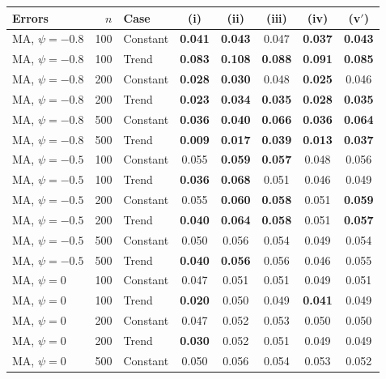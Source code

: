 \begin{tabular}{lrlccccc}
\toprule
Errors & $n$ & Case & (i) & (ii) & (iii) & (iv) & (v$'$) \\
\midrule
MA, $\psi = -0.8$ & 100 & Constant & \textbf{0.041} & \textbf{0.043} & 0.047 & \textbf{0.037} & \textbf{0.043} \\
MA, $\psi = -0.8$ & 100 & Trend & \textbf{0.083} & \textbf{0.108} & \textbf{0.088} & \textbf{0.091} & \textbf{0.085} \\
MA, $\psi = -0.8$ & 200 & Constant & \textbf{0.028} & \textbf{0.030} & 0.048 & \textbf{0.025} & 0.046 \\
MA, $\psi = -0.8$ & 200 & Trend & \textbf{0.023} & \textbf{0.034} & \textbf{0.035} & \textbf{0.028} & \textbf{0.035} \\
MA, $\psi = -0.8$ & 500 & Constant & \textbf{0.036} & \textbf{0.040} & \textbf{0.066} & \textbf{0.036} & \textbf{0.064} \\
MA, $\psi = -0.8$ & 500 & Trend & \textbf{0.009} & \textbf{0.017} & \textbf{0.039} & \textbf{0.013} & \textbf{0.037} \\
\addlinespace
MA, $\psi = -0.5$ & 100 & Constant & 0.055 & \textbf{0.059} & \textbf{0.057} & 0.048 & 0.056 \\
MA, $\psi = -0.5$ & 100 & Trend & \textbf{0.036} & \textbf{0.068} & 0.051 & 0.046 & 0.049 \\
MA, $\psi = -0.5$ & 200 & Constant & 0.055 & \textbf{0.060} & \textbf{0.058} & 0.051 & \textbf{0.059} \\
MA, $\psi = -0.5$ & 200 & Trend & \textbf{0.040} & \textbf{0.064} & \textbf{0.058} & 0.051 & \textbf{0.057} \\
MA, $\psi = -0.5$ & 500 & Constant & 0.050 & 0.056 & 0.054 & 0.049 & 0.054 \\
MA, $\psi = -0.5$ & 500 & Trend & \textbf{0.040} & \textbf{0.056} & 0.056 & 0.046 & 0.055 \\
\addlinespace
MA, $\psi = 0$ & 100 & Constant & 0.047 & 0.051 & 0.051 & 0.049 & 0.051 \\
MA, $\psi = 0$ & 100 & Trend & \textbf{0.020} & 0.050 & 0.049 & \textbf{0.041} & 0.049 \\
MA, $\psi = 0$ & 200 & Constant & 0.047 & 0.052 & 0.053 & 0.050 & 0.050 \\
MA, $\psi = 0$ & 200 & Trend & \textbf{0.030} & 0.052 & 0.051 & 0.049 & 0.049 \\
MA, $\psi = 0$ & 500 & Constant & 0.050 & 0.056 & 0.054 & 0.053 & 0.052 \\

\end{tabular}
